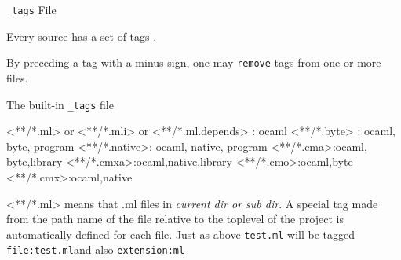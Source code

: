 \verb|_tags| File

Every source has a set of tags .

By preceding a tag with a minus sign, one may \verb|remove| tags from one or
more files.

The built-in \verb|_tags| file
\begin{bluetext}
<**/*.ml>   or <**/*.mli> or <**/*.ml.depends> : ocaml 
<**/*.byte> : ocaml, byte, program 
<**/*.native>: ocaml, native, program
<**/*.cma>:ocaml, byte,library
<**/*.cmxa>:ocaml,native,library
<**/*.cmo>:ocaml,byte
<**/*.cmx>:ocaml,native
\end{bluetext}
<**/*.ml> means that .ml files in \emph{current dir or sub dir}. A
special tag made from the path name of the file relative to the
toplevel of the project is automatically defined for each file.  Just
as above \verb|test.ml| will be tagged \verb|file:test.ml|and also
\verb|extension:ml|

